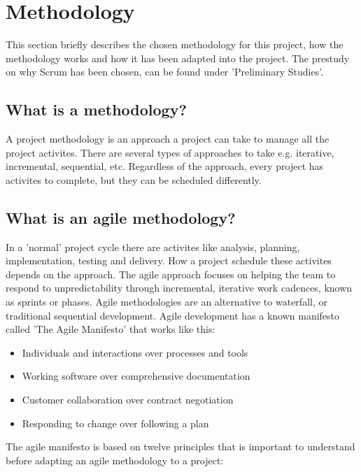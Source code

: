 \section{Methodology}

This section briefly describes the chosen methodology for this project, how the methodology works and how it has been adapted into the project. The prestudy on why Scrum has been chosen, can be found under 'Preliminary Studies'. 

\subsection*{What is a methodology?}

A project methodology is an approach a project can take to manage all the project activites. There are several types of approaches to take e.g. iterative, incremental, sequential, etc. Regardless of the approach, every project has activites to complete, but they can be scheduled differently.

\subsection*{What is an agile methodology?}

In a 'normal' project cycle there are activites like analysis, planning, implementation, testing and delivery. How a project schedule these activites depends on the approach. 
The agile approach focuses on helping the team to respond to unpredictability through incremental, iterative work cadences, known as sprints or phases. Agile methodologies are an alternative to waterfall, or traditional sequential development.
Agile development has a known manifesto called 'The Agile Manifesto' that works like this:

\begin{itemize}
	\item Individuals and interactions over processes and tools
    \item Working software over comprehensive documentation
    \item Customer collaboration over contract negotiation
    \item Responding to change over following a plan 
\end{itemize}

The agile manifesto is based on twelve principles that is important to understand before
adapting an agile methodology to a project:

